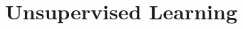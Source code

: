 \chapter{Unsupervised Learning}

\begin{ex}
\end{ex}

\begin{ex}
\end{ex}

\begin{ex}
\end{ex}

\begin{ex}
\end{ex}

\begin{ex}
\end{ex}

\begin{ex}
\end{ex}

\begin{ex}
\end{ex}

\begin{ex}
\end{ex}

\begin{ex}
\end{ex}

\begin{ex}
\end{ex}

\begin{ex}
\end{ex}

\begin{ex}
\end{ex}

\begin{ex}
\end{ex}

\begin{ex}
\end{ex}

\begin{ex}
\end{ex}

\begin{ex}
\end{ex}

\begin{ex}
\end{ex}

